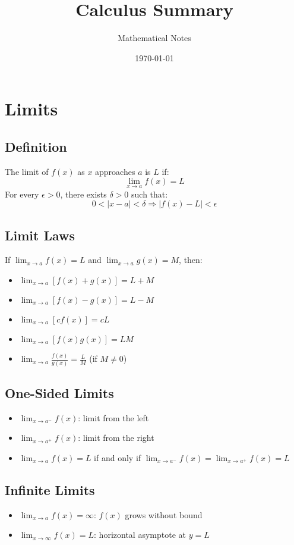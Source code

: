 \documentclass[11pt]{article}
\title{Calculus Summary}
\author{Mathematical Notes}
\date{\today}
\begin{document}
\maketitle

\tableofcontents
\newpage

\section{Limits}

\subsection{Definition}
The limit of $f(x)$ as $x$ approaches $a$ is $L$ if:
$$\lim_{x \to a} f(x) = L$$
For every $\epsilon > 0$, there exists $\delta > 0$ such that:
$$0 < |x - a| < \delta \Rightarrow |f(x) - L| < \epsilon$$

\subsection{Limit Laws}
If $\lim_{x \to a} f(x) = L$ and $\lim_{x \to a} g(x) = M$, then:
\begin{itemize}
    \item $\lim_{x \to a} [f(x) + g(x)] = L + M$
    \item $\lim_{x \to a} [f(x) - g(x)] = L - M$
    \item $\lim_{x \to a} [cf(x)] = cL$
    \item $\lim_{x \to a} [f(x)g(x)] = LM$
    \item $\lim_{x \to a} \frac{f(x)}{g(x)} = \frac{L}{M}$ (if $M \neq 0$)
\end{itemize}

\subsection{One-Sided Limits}
\begin{itemize}
    \item $\lim_{x \to a^-} f(x)$: limit from the left
    \item $\lim_{x \to a^+} f(x)$: limit from the right
    \item $\lim_{x \to a} f(x) = L$ if and only if $\lim_{x \to a^-} f(x) = \lim_{x \to a^+} f(x) = L$
\end{itemize}

\subsection{Infinite Limits}
\begin{itemize}
    \item $\lim_{x \to a} f(x) = \infty$: $f(x)$ grows without bound
    \item $\lim_{x \to \infty} f(x) = L$: horizontal asymptote at $y = L$
\end{itemize}
\end{document}
